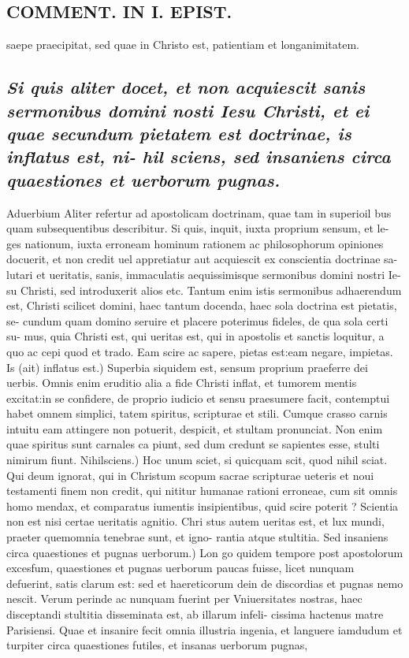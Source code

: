 \documentclass{article}
\begin{document}
\begin{pages}
\section*{COMMENT. IN I. EPIST. }
\marginpar{[ p.530 ]}\pstart saepe praecipitat, sed quae in Christo est, patientiam et longanimitatem.  \pend
{}
{}
\subsection*{\textit{Si quis aliter docet, et non acquiescit sanis sermonibus domini nosti Iesu Christi, et ei quae secundum pietatem est doctrinae, is inflatus est, ni- hil sciens, sed insaniens circa quaestiones et uerborum pugnas. }}\pstart Aduerbium Aliter refertur ad apostolicam doctrinam, quae tam in superioil bus quam subsequentibus describitur. Si quis, inquit, iuxta proprium sensum, et le- ges nationum, iuxta erroneam hominum rationem ac philosophorum opiniones docuerit, et non credit uel appretiatur aut acquiescit ex conscientia doctrinae sa- lutari et ueritatis, sanis, immaculatis aequissimisque sermonibus domini nostri Ie- su Christi, sed introduxerit alios etc. Tantum enim istis sermonibus adhaerendum est, Christi scilicet domini, haec tantum docenda, haec sola doctrina est pietatis, se- cundum quam domino seruire et placere poterimus fideles, de qua sola certi su- mus, quia Christi est, qui ueritas est, qui in apostolis et sanctis loquitur, a quo ac cepi quod et trado. Eam scire ac sapere, pietas est:eam negare, impietas. Is (ait) inflatus est.) Superbia siquidem est, sensum proprium praeferre dei uerbis. Omnis enim eruditio alia a fide Christi inflat, et tumorem mentis excitat:in se confidere, de proprio iudicio et sensu praesumere facit, contemptui habet omnem simplici, tatem spiritus, scripturae et stili. Cumque crasso carnis intuitu eam attingere non potuerit, despicit, et stultam pronunciat. Non enim quae spiritus sunt carnales ca piunt, sed dum credunt se sapientes esse, stulti nimirum fiunt. Nihilsciens.) Hoc unum sciet, si quicquam scit, quod nihil sciat. Qui deum ignorat, qui in Christum scopum sacrae scripturae ueteris et noui testamenti finem non credit, qui nititur humanae rationi erroneae, cum sit omnis homo mendax, et comparatus iumentis insipientibus, quid scire poterit ? Scientia non est nisi certae ueritatis agnitio. Chri stus autem ueritas est, et lux mundi, praeter quemomnia tenebrae sunt, et igno- rantia atque stultitia. Sed insaniens circa quaestiones et pugnas uerborum.) Lon go quidem tempore post apostolorum excesfum, quaestiones et pugnas uerborum paucas fuisse, licet nunquam defuerint, satis clarum est: sed et haereticorum dein de discordias et pugnas nemo nescit. Verum perinde ac nunquam fuerint per Vniuersitates nostras, haec disceptandi stultitia disseminata est, ab illarum infeli- cissima hactenus matre Parisiensi. Quae et insanire fecit omnia illustria ingenia, et languere iamdudum et turpiter circa quaestiones futiles, et insanas uerborum pugnas, 
\end{pages}
\end{document}

